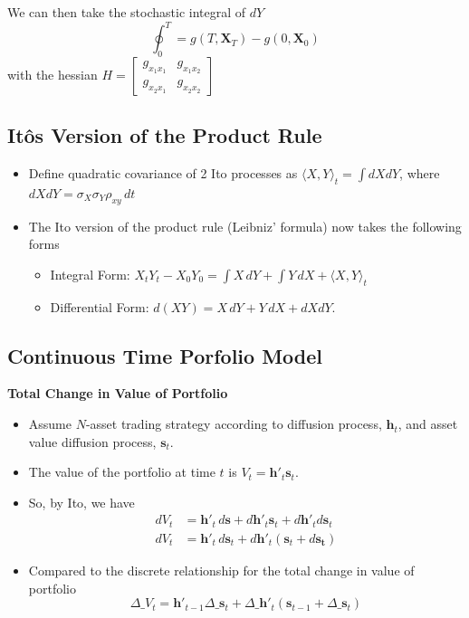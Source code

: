 \documentclass[11pt]{article}
\begin{document}
We can then take the stochastic integral of $dY$
\[ \oint_0^T = g(T, \boldsymbol{X}_T) - g(0, \boldsymbol{X}_0) \]
with the hessian $H = \begin{bmatrix}
    g_{x_1 x_1} & g_{x_1 x_2} \\
    g_{x_2 x_1} & g_{x_2 x_2} 
\end{bmatrix}$

\subsection{It\^{o}s Version of the Product Rule}
\begin{itemize}
    \item Define quadratic covariance of 2 Ito processes as ${\langle X,Y\rangle}_t = \int 
    dXdY$, where $dXdY = \sigma_X \sigma_Y \rho_{xy} \,dt$
    \item The Ito version of the product rule (Leibniz' formula) now takes the following forms 
    \begin{itemize}
        \item Integral Form: $X_t Y_t - X_0 Y_0 = \int X\,dY + \int Y\,dX + {\langle X,Y
        \rangle}_t$
        \item Differential Form: $d(XY) = X\,dY + Y\,dX + dXdY$.
    \end{itemize}
\end{itemize}

\subsection{Continuous Time Porfolio Model}
\textbf{Total Change in Value of Portfolio}
\begin{itemize}
    \item Assume $N$-asset trading strategy according to diffusion process, $\boldsymbol{h}_t$,
    and asset value diffusion process, $\boldsymbol{s}_t$.
    \item The value of the portfolio at time $t$ is $V_t = \boldsymbol{h}'_t \boldsymbol{s}_t$.
    \item So, by Ito, we have 
    \begin{align*}
        dV_t &= \boldsymbol{h}'_t \,d\boldsymbol{s} + d\boldsymbol{h}'_t \boldsymbol{s}_t + 
        d\boldsymbol{h}'_t d\boldsymbol{s}_t \\
        dV_t &= \boldsymbol{h}'_t\,d\boldsymbol{s}_t + d\boldsymbol{h}'_t(\boldsymbol{s}_t + 
        d\boldsymbol{s_t})
    \end{align*}
    \item Compared to the discrete relationship for the total change in value of portfolio 
    \[
    \Delta\_V_t = \boldsymbol{h}'_{t-1} \Delta \_ \boldsymbol{s}_t + \Delta \_ 
    \boldsymbol{h}'_t (\boldsymbol{s}_{t-1} + \Delta \_ \boldsymbol{s}_t)
    \]
\end{itemize}
\end{document}
